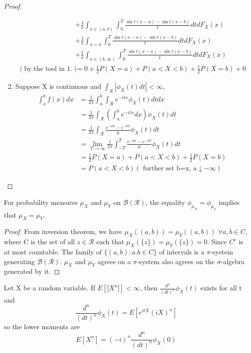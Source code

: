 \documentclass[../Transformation.tex]{subfiles}
\begin{document}
\begin{proof}
\begin{enumerate}
\begin{align*}
		&+\frac{1}{\pi}\int_{x\in(a,b)}\int_0^{T}\frac{\sin t(x-a) - \sin t(x-b)}{t}dtdF_X(x)\\
		&+\frac{1}{\pi}\int_{x=b}\int_0^{T}\frac{\sin t(x-a) - \sin t(x-b)}{t}dtdF_X(x)\\
		&+\frac{1}{\pi}\int_{x\in(b,\infty)}\int_0^{T}\frac{\sin t(x-a) - \sin t(x-b)}{t}dtdF_X(x)\\
		(\mbox{by the tool in 1.})&=0+\frac{1}{2}P(X=a) + P(a<X<b) + \frac{1}{2}P(X=b) + 0
		\end{align*}
	\item Suppose X is continuous and $\int_{\mathcal{R}}|\phi_X(t)dt|<\infty$,
	\begin{align*}
	\int_a^bf(x)dx&=\frac{1}{2\pi}\int_a^b\int_{\mathcal{R}}e^{-itx}\phi_X(t)dtdx\\
	&=\frac{1}{2\pi}\int_{\mathcal{R}}(\int_a^be^{-itx}dx)\phi_X(t)dt\\
	&=\frac{1}{2\pi}\int_{\mathcal{R}}\frac{e^{-ita}-e^{-itb}}{it}\phi_X(t)dt\\
	&=\lim_{T\rightarrow\infty}\frac{1}{2\pi}\int_{-T}^T\frac{e^{-ita}-e^{-itb}}{it}\phi_X(t)dt\\
	&=\frac{1}{2}P(X=a) + P(a<X<b) + \frac{1}{2}P(X=b)\\
	&=P(a<X<b)
	(  \mbox{ further set b=x, a$\downarrow -\infty$})
	\end{align*}
	\end{enumerate}
\end{proof}
\begin{corollary}
For probability measures $\mu_X$ and $\mu_Y$ on $\mathcal{B}(\mathcal{R})$, the equality $\phi_{\mu_X}=\phi_{\mu_Y}$ implies that $\mu_X=\mu_Y$.
\end{corollary}
\begin{proof}
From inversion theorem, we have $\mu_X((a,b))=\mu_Y((a,b))$ $\forall a,b\in C$, where C is the set of all $z\in\mathcal{R}$ such that $\mu_X(\{z\})=\mu_Y(\{z\})=0$. Since $C^c$ is at most countable. The family of $\{(a,b):a.b\in C\}$ of intervals is a $\pi$-system generating $\mathcal{B}(\mathcal{R})$. $\mu_X$ and $\mu_Y$ agrees on a $\pi$-system also agrees on the $\sigma$-algebra generated by it.
\end{proof}
\begin{intuition}
Let X be a random variable. If $E[|X^n|]<\infty$, then $\frac{d^n}{(dt)^n}\phi_X(t)$ exists for all t and 
$$\frac{d^n}{(dt)^n}\phi_X(t)=E[e^{itX}(iX)^n]$$
so the lower moments are
$$E[X^n]=(-i)^n\frac{d^n}{(dt)^n}\phi_X(0)$$
\end{intuition}
\end{document}

